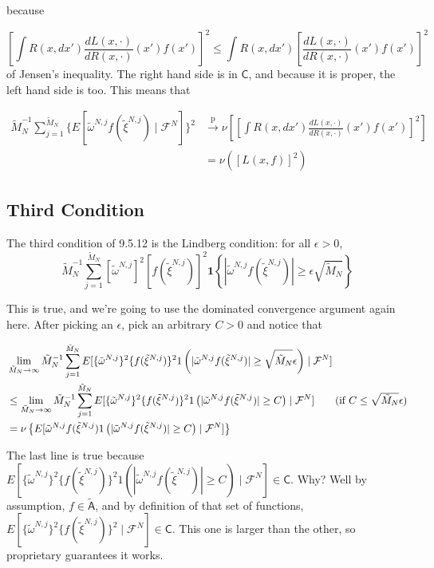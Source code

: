 \documentclass{article}
\begin{document}
because

$$
\left[ \int R(x,dx') \frac{dL(x,\cdot)}{dR(x,\cdot)}(x') f(x') \right]^2 \le \int R(x,dx')\left[ \frac{dL(x,\cdot)}{dR(x,\cdot)}(x') f(x') \right]^2
$$
of Jensen's inequality. The right hand side is in $\mathsf{C}$, and because it is proper, the left hand side is too. This means that 

\begin{align*}
\tilde{M}_N^{-1}\sum_{j=1}^{\tilde{M}_N} \{E\left[  \tilde{\omega}^{N,j} f(\tilde{\xi}^{N,j})  \mid \mathcal{F}^N \right]\}^2 
&\overset{\text{p}}{\to} \nu\left[ \left[ \int R(x,dx') \frac{dL(x,\cdot)}{dR(x,\cdot)}(x') f(x') \right]^2  \right] \\
&= \nu\left(\left[L(x,f) \right]^2\right)
\end{align*}


\subsection{Third Condition}


The third condition of 9.5.12 is the Lindberg condition: for all $\epsilon > 0$,
$$
\tilde{M}_N^{-1} \sum_{j=1}^{\tilde{M}_N} [\tilde{\omega}^{N,j}]^2 [f(\tilde{\xi}^{N,j})]^2 \mathbf{1}\left\{ |\tilde{\omega}^{N,j} f(\tilde{\xi}^{N,j}) | \ge \epsilon\sqrt{\tilde{M}_N}   \right\}
$$



This is true, and we're going to use the dominated convergence argument again here. After picking an $\epsilon$, pick an arbitrary $C > 0$ and notice that

\begin{align*}
& \lim_{\tilde{M}_N \to \infty} \tilde{M}_N^{-1} \sum_{j=1}^{\tilde{M}_N} E[ \{\tilde{\omega}^{N,j}\}^2 \{ f(\tilde{\xi}^{N,j})\}^2 1\left( |\tilde{\omega}^{N,j} f(\tilde{\xi}^{N,j})| \ge \sqrt{\tilde{M}_N} \epsilon \right) \mid \mathcal{F}^N]  \\
&\le \lim_{\tilde{M}_N \to \infty} \tilde{M}_N^{-1} \sum_{j=1}^{\tilde{M}_N} E[  \{\tilde{\omega}^{N,j}\}^2 \{ f(\tilde{\xi}^{N,j})\}^2 1\left( |\tilde{\omega}^{N,j} f(\tilde{\xi}^{N,j})| \ge C \right) \mid \mathcal{F}^N]  \tag{if $C \le \sqrt{\tilde{M}_N} \epsilon$} \\
&= \nu\left\{ E[ \tilde{\omega}^{N,j} f(\tilde{\xi}^{N,j}) 1\left( |\tilde{\omega}^{N,j} f(\tilde{\xi}^{N,j})| \ge C \right) \mid \mathcal{F}^N] \right\}
\end{align*}

The last line is true because $E[  \{\tilde{\omega}^{N,j}\}^2 \{ f(\tilde{\xi}^{N,j})\}^2 1\left( |\tilde{\omega}^{N,j} f(\tilde{\xi}^{N,j})| \ge C \right) \mid \mathcal{F}^N]   \in \mathsf{C}$. Why? Well by assumption, $f \in \tilde{\mathsf{A}}$, and by definition of that set of functions, $E[  \{\tilde{\omega}^{N,j}\}^2 \{ f(\tilde{\xi}^{N,j})\}^2  \mid \mathcal{F}^N]   \in \mathsf{C}$. This one is larger than the other, so proprietary guarantees it works. 
\end{document}
